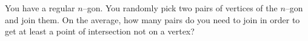   You have a regular $n$--gon.
  You randomly pick two pairs of vertices of the $n$--gon and join them.
  On the average, how many pairs do you need to join in order to get
  at least a point of intersection not on a vertex?
